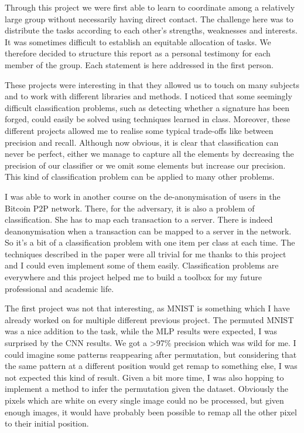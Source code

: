 \documentclass{homework}
\begin{document}
\maketitle



Through this project we were first able to learn to coordinate among a relatively large group without necessarily having direct contact. The challenge here was to distribute the tasks according to each other's strengths, weaknesses and interests. It was sometimes difficult to establish an equitable allocation of tasks. We therefore decided to structure this report as a personal testimony for each member of the group. Each statement is here addressed in the first person.

These projects were interesting in that they allowed us to touch on many subjects and to work with different libraries and methods. I noticed that some seemingly difficult classification problems, such as detecting whether a signature has been forged, could easily be solved using techniques learned in class. Moreover, these different projects allowed me to realise some typical trade-offs like between precision and recall. Although now obvious, it is clear that classification can never be perfect, either we manage to capture all the elements by decreasing the precision of our classifier or we omit some elements but increase our precision. This kind of classification problem can be applied to many other problems.

I was able to work in another course on the de-anonymisation of users in the Bitcoin P2P network. There, for the adversary, it is also a problem of classification. She has to map each transaction to a server. There is indeed deanonymisation when a transaction can be mapped to a server in the network. So it's a bit of a classification problem with one item per class at each time. The techniques described in the paper were all trivial for me thanks to this project and I could even implement some of them easily. Classification problems are everywhere and this project helped me to build a toolbox for my future professional and academic life.

The first project was not that interesting, as MNIST is something which I have already worked on for multiple different previous project. The permuted MNIST was a nice addition to the task, while the MLP results were expected, I was surprised by the CNN results. We got a >97\% precision which was wild for me. I could imagine some patterns reappearing after permutation, but considering that the same pattern at a different position would get remap to something else, I was not expected this kind of result. Given a bit more time, I was also hopping to implement a method to infer the permutation given the dataset. Obviously the pixels which are white on every single image could no be processed, but given enough images, it would have probably been possible to remap all the other pixel to their initial position. 
\end{document}
